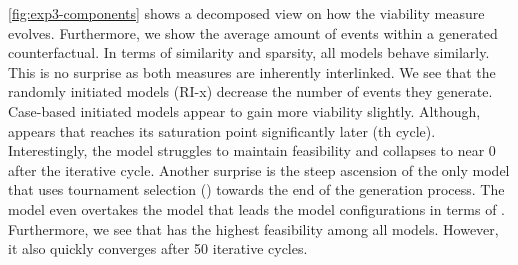 \documentclass[./../../paper.tex]{subfiles}
\begin{document}
\autoref{fig:exp3-components} shows a decomposed view on how the viability measure evolves. Furthermore, we show the average amount of events within a generated counterfactual. 
In terms of similarity and sparsity, all models behave similarly. This is no surprise as both measures are inherently interlinked. 
We see that the randomly initiated models (RI-x) decrease the number of events they generate. 
Case-based initiated models appear to gain more viability slightly. Although,   appears that reaches its saturation point significantly later (th cycle).
Interestingly, the  model struggles to maintain feasibility and collapses to near 0 after the  iterative cycle. 
Another surprise is the steep ascension of the only model that uses tournament selection () towards the end of the generation process. The model even overtakes the model that leads the model configurations in terms of . 
Furthermore, we see that  has the highest feasibility among all models. However, it also quickly converges after 50 iterative cycles.    
   



\end{document}
